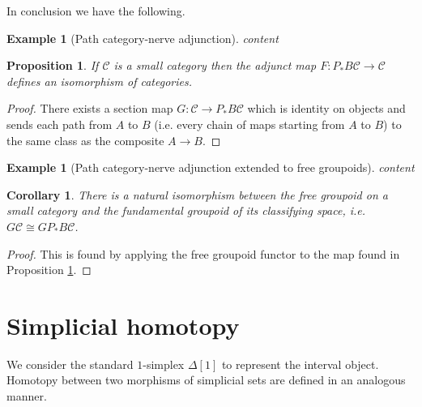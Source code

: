 \documentclass[12pt]{report}
\numberwithin{equation}{section}
\newtheorem{corollary}[dummy]{Corollary}
\newtheorem{proposition}[dummy]{Proposition}
\newtheorem{example}[dummy]{Example}
\begin{document}
	In conclusion we have the following.
	\begin{example}[Path category-nerve adjunction]
		content
	\end{example}
	\begin{proposition}\label{naturalisofundgrpd}
		If \( \mathcal{C} \) is a small category then the adjunct map \(F: P_*B \mathcal{C} \to \mathcal{C} \) defines an isomorphism of categories.
	\end{proposition}
	\begin{proof}
		There exists a section map \( G: \mathcal{C} \to P_*B\mathcal{C} \) which is identity on objects and sends each path from \( A\) to \( B \) (i.e. every chain of maps starting from \( A \) to \( B \)) to the same class as the composite \( A \to B \).
	\end{proof}
	\begin{example}[Path category-nerve adjunction extended to free groupoids]
		content
	\end{example}
	\begin{corollary}\label{cor:freegrpdisofundgrpd}
		There is a natural isomorphism between the free groupoid on a small category and the fundamental groupoid of its classifying space, i.e. \( G\mathcal{C} \cong GP_* B\mathcal{C} \).
	\end{corollary}
	\begin{proof}
		This is found by applying the free groupoid functor to the map found in Proposition \ref{naturalisofundgrpd}.
	\end{proof}
	
	\section{Simplicial homotopy}
	We consider the standard $1$-simplex $\Delta[1]$ to represent the interval object. Homotopy between two morphisms of simplicial sets are defined in an analogous manner.
	
\end{document}
